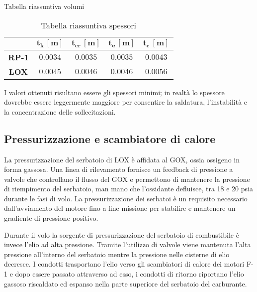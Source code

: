 \begin{table}[H]
\caption{Tabella riassuntiva volumi}
\label{table:volumi}

\vspace{5pt}

\begin{tabular}{|c|c|c|c|c|}
\hline
& $\bm{t_{k} \, [m]}$ & $\bm{t_{cr} \, [m]}$ & $\bm{t_{e} \, [m]}$ & $\bm{t_{c}\, [m]}$\\
\hline
\textbf{RP-1} & $0.0034$ & $0.0035$ & $0.0035$ & $0.0043$\\
\hline
\textbf{LOX} & $0.0045$ & $0.0046$ & $0.0046$ & $0.0056$\\
\hline
\end{tabular}


\caption{Tabella riassuntiva spessori}
\label{table:spessori}


\end{table}



I valori ottenuti risultano essere gli spessori minimi; in realtà lo spessore dovrebbe essere leggermente maggiore per consentire la saldatura, l'instabilità e la concentrazione delle sollecitazioni. 

\subsection{Pressurizzazione e scambiatore di calore}
\label{subsec:pressurizzazione_e_scambiatore_di_calore}

La pressurizzazione del serbatoio di LOX è affidata al GOX, ossia ossigeno in forma gassosa. Una linea di rilevamento fornisce un feedback di pressione a valvole che controllano il flusso del GOX e permettono di mantenere la pressione di riempimento del serbatoio, man mano che l’ossidante defluisce, tra 18 e 20 psia durante le fasi di volo. La pressurizzazione dei serbatoi è un requisito necessario dall’avviamento del motore fino a fine missione per stabilire e mantenere un gradiente di pressione positivo.

Durante il volo la sorgente di pressurizzazione del serbatoio di combustibile è invece l’elio ad alta pressione. Tramite l’utilizzo di valvole viene mantenuta l’alta pressione all’interno del serbatoio mentre la pressione nelle cisterne di elio decresce. 
I condotti trasportano l’elio verso gli scambiatori di calore dei motori F-1 e dopo essere passato attraverso ad esso, i condotti di ritorno riportano l’elio gassoso riscaldato ed espanso nella parte superiore del serbatoio del carburante.


